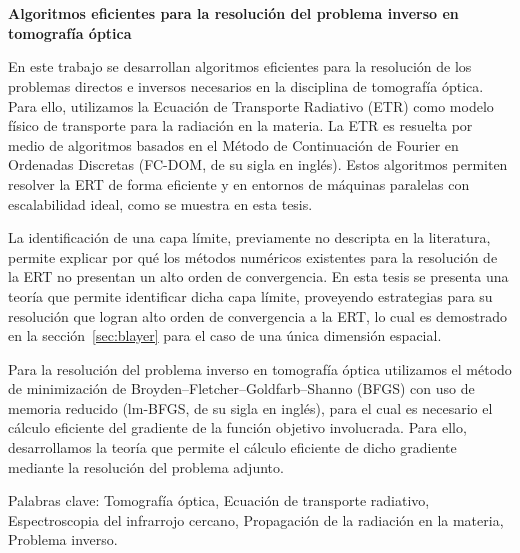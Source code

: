 \chapter*{}%
%

\begin{center}
\begin{large}
\textbf{Algoritmos eficientes para la resolución 
del problema inverso en tomografía óptica}
\end{large}
\end{center}

\vspace{1cm}
En este trabajo se desarrollan   
algoritmos eficientes para la resolución de los problemas directos 
e inversos necesarios en la disciplina de tomografía óptica. Para ello, utilizamos la Ecuación de Transporte 
Radiativo (ETR) como modelo físico de transporte para la radiación 
en la materia. 
La ETR es resuelta por medio de algoritmos basados en el Método  
de Continuación de Fourier en Ordenadas Discretas (FC-DOM, de su sigla en inglés). Estos algoritmos 
permiten resolver la ERT de forma eficiente y en entornos de máquinas paralelas 
con escalabilidad ideal, como se muestra en esta tesis. 

La identificación de una capa límite, previamente no descripta en la literatura, 
permite explicar por qué los métodos numéricos existentes para la resolución de la ERT 
no presentan un alto orden de convergencia. En esta tesis se presenta 
una teoría que permite identificar dicha capa límite, proveyendo  
estrategias para su resolución que logran alto orden de convergencia 
a la ERT, lo cual es demostrado en la sección~\ref{sec:blayer} para el caso de una única dimensión espacial.

Para la resolución del problema inverso en tomografía óptica utilizamos el método de minimización 
de Broyden–Fletcher–Goldfarb–Shanno (BFGS) con uso de memoria reducido 
(lm-BFGS, de su sigla en inglés), 
para el cual es necesario el cálculo eficiente del gradiente 
de la función objetivo involucrada. Para ello, desarrollamos la teoría 
que permite el cálculo eficiente de dicho gradiente  
mediante la resolución del problema adjunto. 


\vspace{1cm}
\noindent
Palabras clave: 
Tomografía óptica,
Ecuación de transporte radiativo, 
Espectroscopia del infrarrojo cercano, 
Propagación de la radiación en la materia,
Problema inverso.
